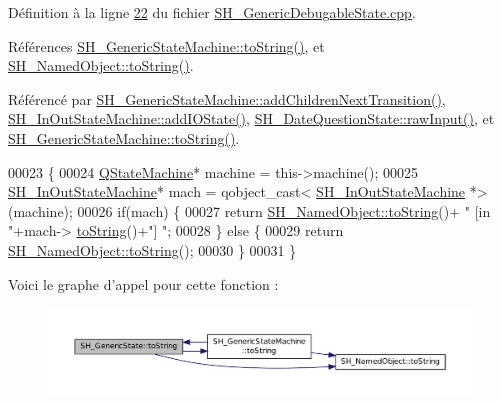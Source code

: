Définition à la ligne \hyperlink{SH__GenericDebugableState_8cpp_source_l00022}{22} du fichier \hyperlink{SH__GenericDebugableState_8cpp_source}{S\-H\-\_\-\-Generic\-Debugable\-State.\-cpp}.



Références \hyperlink{classSH__GenericStateMachine_a85c0c1c9d258ae991f84667412fa47cd}{S\-H\-\_\-\-Generic\-State\-Machine\-::to\-String()}, et \hyperlink{classSH__NamedObject_a9f4b19df6a96a17daaf1060b3019ef47}{S\-H\-\_\-\-Named\-Object\-::to\-String()}.



Référencé par \hyperlink{classSH__GenericStateMachine_a16d844020bc26480bd81d6b794c8364c}{S\-H\-\_\-\-Generic\-State\-Machine\-::add\-Children\-Next\-Transition()}, \hyperlink{classSH__InOutStateMachine_a2528cffddbe6f98c32ebef41423c0118}{S\-H\-\_\-\-In\-Out\-State\-Machine\-::add\-I\-O\-State()}, \hyperlink{classSH__DateQuestionState_a71917e94cb9ce692f916a848bc8c8892}{S\-H\-\_\-\-Date\-Question\-State\-::raw\-Input()}, et \hyperlink{classSH__GenericStateMachine_a85c0c1c9d258ae991f84667412fa47cd}{S\-H\-\_\-\-Generic\-State\-Machine\-::to\-String()}.


\begin{DoxyCode}
00023 \{
00024     \hyperlink{classQStateMachine}{QStateMachine}* machine = this->machine();
00025     \hyperlink{classSH__InOutStateMachine}{SH\_InOutStateMachine}* mach = qobject\_cast<
      \hyperlink{classSH__InOutStateMachine}{SH\_InOutStateMachine} *>(machine);
00026     \textcolor{keywordflow}{if}(mach) \{
00027         \textcolor{keywordflow}{return} \hyperlink{classSH__NamedObject_a9f4b19df6a96a17daaf1060b3019ef47}{SH\_NamedObject::toString}()+ \textcolor{stringliteral}{" [in "}+mach->
      \hyperlink{classSH__GenericStateMachine_a85c0c1c9d258ae991f84667412fa47cd}{toString}()+\textcolor{stringliteral}{"] "};
00028     \} \textcolor{keywordflow}{else} \{
00029         \textcolor{keywordflow}{return} \hyperlink{classSH__NamedObject_a9f4b19df6a96a17daaf1060b3019ef47}{SH\_NamedObject::toString}();
00030     \}
00031 \}
\end{DoxyCode}


Voici le graphe d'appel pour cette fonction \-:\nopagebreak
\begin{figure}[H]
\begin{center}
\leavevmode
\includegraphics[width=350pt]{classSH__GenericState_a7779babbb40f3f8faa71112204d9804f_cgraph}
\end{center}
\end{figure}




